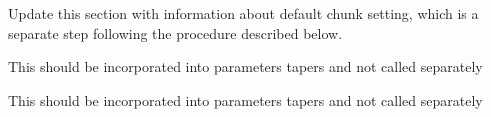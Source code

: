 \begin{DoxyRefList}
\item[Module \mbox{\hyperlink{a00839}{advanced\+Topics\+\_\+parameter\+Updates\+\_\+sequences}} ]\label{a00800__todo000002}%
%
Update this section with information about default chunk setting, which is a separate step following the procedure described below. 
\item[Member \mbox{\hyperlink{a00461_a596d5ea393d43f6f798a838aefe3cecd}{DBTo\+Gain}} (double dB)]\label{a00800__todo000017}%
%
This should be incorporated into parameters\textquotesingle{} tapers and not called separately  
\item[Member \mbox{\hyperlink{a00461_a76f29f12e35c093e5c198b8d0e27b6f9}{Gain\+To\+DB}} (double a\+Gain)]\label{a00800__todo000016}%
%
This should be incorporated into parameters\textquotesingle{} tapers and not called separately 
\end{DoxyRefList}